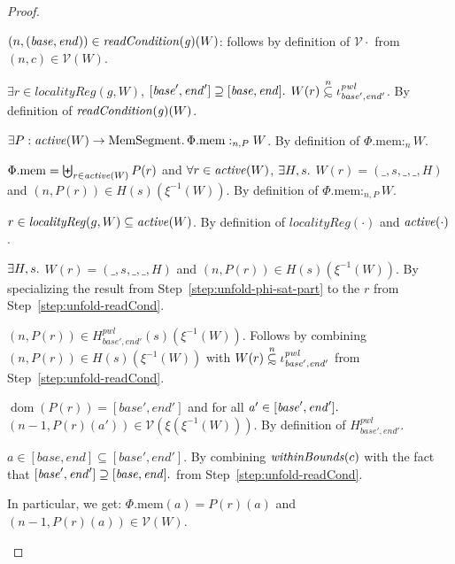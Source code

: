 \documentclass[a4paper]{article}
\newcommand\subsetsim{\mathrel{\ooalign{\raise.2ex\hbox{$\subset$}\cr
      \hidewidth\lower.8ex\hbox{\scalebox{0.9}{$\sim$}}\hidewidth\cr}}}
\newcommand{\nsubsim}[1][n]{\stackrel{\tiny{#1}}{\subsetsim}}
\DeclareMathOperator{\dom}{dom}
\newcommand{\var}[1]{\mathit{#1}}
\newcommand{\gl}{\var{g}}
\newcommand{\addr}{\var{a}}
\newcommand{\start}{\var{base}}
\newcommand{\addrend}{\var{end}}
\newcommand{\heap}{\var{mem}}
\newcommand{\pwl}{\var{pwl}}
\newcommand{\plainproj}[1]{\mathrm{#1}}
\newcommand{\memheap}[1][\Phi]{#1.\plainproj{mem}}
\newcommand{\plainfun}[2]{
  \ifthenelse{\equal{#2}{}}
  {\mathit{#1}}
  {\mathit{#1}(#2)}
}
\newcommand{\withinBounds}[1]{\plainfun{withinBounds}{#1}}
\newcommand{\readCond}[1]{\plainfun{readCondition}{#1}}
\newcommand{\activeReg}[1]{\plainfun{active}{#1}}
\newcommand{\heapSat}[3][\heap]{#1 :_{#2} #3}
\newcommand{\memSatPar}[4][n]{\heapSat[#2]{#1 , #4}{#3}}
\newcommand{\asmType}{\plaindom{AsmType}}
\newcommand{\plaindom}[1]{\mathrm{#1}}
\newcommand{\HeapSegments}{\plaindom{MemSegment}}
\newcommand{\intr}[2]{\mathcal{#1}}
\newcommand{\valueintr}[1]{\intr{V}{#1}}
\newcommand{\stdvr}{\valueintr{\asmType}}
\newcommand{\npair}[2][n]{\left(#1,#2 \right)}
\begin{document}
\begin{proof}
  \begin{enumproof}
  \item $\npair{(\start,\addrend)} \in \readCond{\gl}(W)$: follows by
    definition of $\stdvr{\cdot}$ from $\npair{c}\in\stdvr(W)$.
  \item $\exists r \in \var{localityReg}(g,W)$, $[\start',\addrend'] \supseteq
    [\start,\addrend] \ldotp$ $W(r)\nsubsim[n]
    \iota_{\start',\addrend'}^\pwl$. By definition of $\readCond{\gl}(W)$. \label{step:unfold-readCond}
  \item $\exists P : \activeReg{W} \rightarrow \HeapSegments \ldotp
    \memSatPar{\memheap}{W}{P}$. By definition of $\heapSat[\memheap]{n}{W}$.
  \item $\memheap = \biguplus_{r\in\activeReg{W}}P(r)$ and $\forall r \in
    \activeReg{W}$, $\exists H,s \ldotp$ $W(r) = (\_,s,\_,\_,H)$
    and $\npair[n]{P(r)} \in H(s)(\xi^{-1}(W))$. By definition of
    $\memSatPar{\memheap}{W}{P}$. \label{step:unfold-phi-sat-part}
  \item $r \in \var{localityReg}(g,W)\subseteq \activeReg{W}$. By definition of
    $\var{localityReg}(\cdot)$ and $\activeReg{\cdot}$.
  \item $\exists H,s \ldotp$ $W(r) = (\_,s,\_,\_,H)$
    and $\npair[n]{P(r)} \in H(s)(\xi^{-1}(W))$.
    By specializing the result from
    Step~\ref{step:unfold-phi-sat-part} to the $r$ from
    Step~\ref{step:unfold-readCond}.
  \item $\npair[n]{P(r)} \in H^\pwl_{\start',\addrend'}(s)(\xi^{-1}(W))$.
    Follows by combining $\npair[n]{P(r)} \in H(s)(\xi^{-1}(W))$ with
    $W(r)\nsubsim[n] \iota_{\start',\addrend'}^\pwl$ from Step~\ref{step:unfold-readCond}.
  \item $\dom(P(r)) = [\start',\addrend']$ and for all $\addr' \in
    [\start',\addrend']\ldotp$
    $\npair[n-1]{P(r)(\addr')}\in\stdvr(\xi(\xi^{-1}(W)))$. By definition of $H^\pwl_{\start',\addrend'}$.
  \item $\addr \in [\start,\addrend]\subseteq[\start',\addrend']$. By combining
    $\withinBounds{c}$ with the fact that $[\start',\addrend'] \supseteq
    [\start,\addrend] \ldotp$ from Step~\ref{step:unfold-readCond}.
  \item In particular, we get: $\memheap(\addr) = P(r)(\addr)$ and
    $\npair[n-1]{P(r)(\addr)}\in\stdvr(W)$.
  \end{enumproof}
\end{proof}
\end{document}
